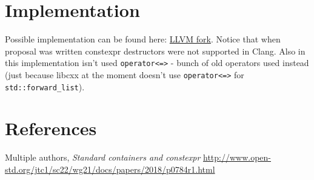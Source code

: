 \documentclass{wg21}
\newcommand{\cc}[1]{\texttt{#1}}
\begin{document}
\section{Implementation}
Possible implementation can be found here: \href{https://github.com/ZaMaZaN4iK/llvm-project/tree/feature/list_constexpr}{LLVM fork}. Notice that when proposal was written constexpr destructors were not supported in Clang. Also in this implementation isn't used \cc{operator<=>} - bunch of old operators used instead (just because libcxx at the moment doesn't use \cc{operator<=>} for \cc{std::forward_list}).

\section{References}
\renewcommand{\section}[2]{}%
\begin{thebibliography}{9}

  Multiple authors,
  \emph{Standard containers and constexpr}\newline
  \url{http://www.open-std.org/jtc1/sc22/wg21/docs/papers/2018/p0784r1.html}

\end{thebibliography}
\end{document}
